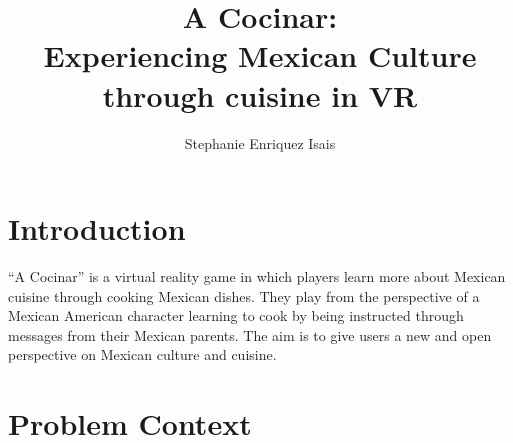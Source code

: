 \documentclass[10pt,twocolumn]{article}
\title{A Cocinar: \\ Experiencing Mexican Culture through cuisine in VR}
\author{Stephanie Enriquez Isais}
\affiliation{Occidental College}
\begin{document}
\maketitle

\section{Introduction}
“A Cocinar” is a virtual reality game in which players learn more about Mexican cuisine through cooking Mexican dishes. They play from the perspective of a Mexican American character learning to cook by being instructed through messages from their Mexican parents. The aim is to give users a new and open perspective on Mexican culture and cuisine. 

\section{Problem Context}
\end{document}
